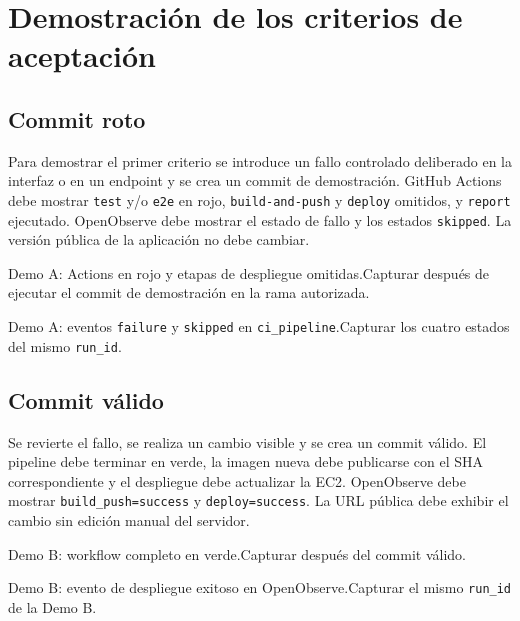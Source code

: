 \documentclass[12pt,a4paper]{article}
\begin{document}
\section{Demostración de los criterios de aceptación}

\subsection{Commit roto}

Para demostrar el primer criterio se introduce un fallo controlado deliberado en la interfaz o en un endpoint y se crea un commit de demostración. GitHub Actions debe mostrar \texttt{test} y/o \texttt{e2e} en rojo, \texttt{build-and-push} y \texttt{deploy} omitidos, y \texttt{report} ejecutado. OpenObserve debe mostrar el estado de fallo y los estados \texttt{skipped}. La versión pública de la aplicación no debe cambiar.

\begin{pendingfigure}{Demo A: Actions en rojo y etapas de despliegue omitidas.}{Capturar después de ejecutar el commit de demostración en la rama autorizada.}
\label{fig:demoa-actions}
\end{pendingfigure}

\begin{pendingfigure}{Demo A: eventos \texttt{failure} y \texttt{skipped} en \texttt{ci\_pipeline}.}{Capturar los cuatro estados del mismo \texttt{run\_id}.}
\label{fig:demoa-oo}
\end{pendingfigure}

\subsection{Commit válido}

Se revierte el fallo, se realiza un cambio visible y se crea un commit válido. El pipeline debe terminar en verde, la imagen nueva debe publicarse con el SHA correspondiente y el despliegue debe actualizar la EC2. OpenObserve debe mostrar \texttt{build\_push=success} y \texttt{deploy=success}. La URL pública debe exhibir el cambio sin edición manual del servidor.

\begin{pendingfigure}{Demo B: workflow completo en verde.}{Capturar después del commit válido.}
\label{fig:demob-actions}
\end{pendingfigure}

\begin{pendingfigure}{Demo B: evento de despliegue exitoso en OpenObserve.}{Capturar el mismo \texttt{run\_id} de la Demo B.}
\label{fig:demob-oo}
\end{pendingfigure}
\end{document}
